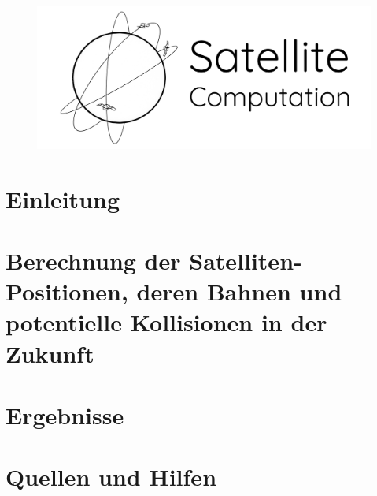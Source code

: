 

\setlength{\footskip}{30pt}


 
 \maketitle 
 
 \begin{figure}[h]
  \centering
  \includegraphics[width=120mm]{figs/logo5}
  \captionsetup{labelformat=empty}
  \caption{}
 \end{figure}
 
 
 
 \thispagestyle{empty}
 \clearpage
 \newpage
 \setcounter{page}{1}
 
 \tableofcontents
 \newpage
 
 \section{Einleitung} \label{Einleitung}
 
 \newpage
 
 \section{Berechnung der Satelliten-Positionen, deren Bahnen und potentielle Kollisionen in der Zukunft} \label{Hauptteil}
 
 \newpage
 
 \section{Ergebnisse} \label{ergebnisse}
 
 \newpage
 
 \section{Quellen und Hilfen} \label{quellen}
 
 

